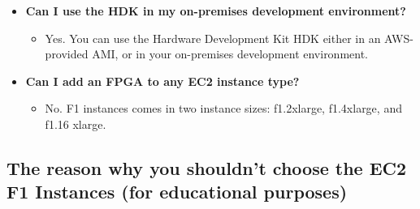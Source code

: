 \documentclass[a4paper]{article}
\begin{document}
\begin{itemize}
        \item[\ding{42}]
        \label{Can I use the HDK in my on-premises development environment?}
        \hypertarget{Can I use the HDK in my on-premises development environment?}{\textbf{Can I use the HDK in my on-premises development environment?}}
        \begin{itemize}
            \item[\ding{45}] Yes. You can use the Hardware Development Kit HDK either in an AWS-provided AMI, or in your on-premises development environment.
        \end{itemize}

        \item[\ding{42}]
        \label{Can I add an FPGA to any EC2 instance type?}
        \hypertarget{Can I add an FPGA to any EC2 instance type?}{\textbf{Can I add an FPGA to any EC2 instance type?}}
        \begin{itemize}
            \item[\ding{45}] No. F1 instances comes in two instance sizes: f1.2xlarge, f1.4xlarge, and f1.16 xlarge.
        \end{itemize}
    \end{itemize}
    
    \newpage

    \subsection{The reason why you shouldn't choose the EC2 F1 Instances (for educational purposes)}
\end{document}
